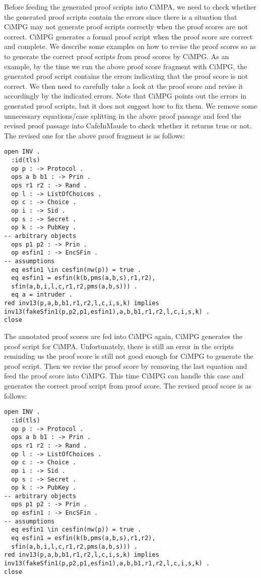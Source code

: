 \documentclass[a4paper,fleqn]{cas-dc}
\begin{document}
Before feeding the generated proof scripts into CiMPA, we need to check whether the generated proof scripts contain the errors since there is a situation that CiMPG may not generate proof scripts correctly when the proof scores are not correct. CiMPG generates a formal proof script when the proof score are correct and complete. We describe some examples on how to revise the proof scores so as to generate the correct proof scripts from proof scores by CiMPG. As an example, by the time we run the above proof score fragment with CiMPG, the generated proof script contains the errors indicating that the proof score is not correct. We then need to carefully take a look at the proof score and revise it accordingly by the indicated errors. Note that CiMPG points out the errors in generated proof scripts, but it does not suggest how to fix them. We remove some unnecessary equations/case splitting in the above proof passage and feed the revised proof passage into CafeInMaude to check whether it returns true or not. The revised one for the above proof fragment is as follows:
\begin{small}
\begin{verbatim}
open INV .
  :id(tls)
  op p : -> Protocol .
  ops a b b1 : -> Prin .
  ops r1 r2 : -> Rand .
  op l : -> ListOfChoices .
  op c : -> Choice .
  op i : -> Sid .
  op s : -> Secret .
  op k : -> PubKey .
-- arbitrary objects
  ops p1 p2 : -> Prin .
  op esfin1 : -> EncSFin .
-- assumptions
  eq esfin1 \in cesfin(nw(p)) = true .
  eq esfin1 = esfin(k(b,pms(a,b,s),r1,r2),
  sfin(a,b,i,l,c,r1,r2,pms(a,b,s))) .
  eq a = intruder .
red inv13(p,a,b,b1,r1,r2,l,c,i,s,k) implies
inv13(fakeSfin1(p,p2,p1,esfin1),a,b,b1,r1,r2,l,c,i,s,k) .
close
\end{verbatim}
\end{small}
The annotated proof scores are fed into CiMPG again, CiMPG  generates the proof script for CiMPA. Unfortunately, there is still an error in the scripts reminding us the proof score is still not good enough for CiMPG to generate the proof script. Then we revise the proof score by removing the last equation and feed the proof score into CiMPG. This time CiMPG can handle this case and generates the correct proof script from proof score. The revised proof score is as follows:
\begin{small}
\begin{verbatim}
open INV .
  :id(tls)
  op p : -> Protocol .
  ops a b b1 : -> Prin .
  ops r1 r2 : -> Rand .
  op l : -> ListOfChoices .
  op c : -> Choice .
  op i : -> Sid .
  op s : -> Secret .
  op k : -> PubKey .
-- arbitrary objects
  ops p1 p2 : -> Prin .
  op esfin1 : -> EncSFin .
-- assumptions
  eq esfin1 \in cesfin(nw(p)) = true .
  eq esfin1 = esfin(k(b,pms(a,b,s),r1,r2),
  sfin(a,b,i,l,c,r1,r2,pms(a,b,s))) .
red inv13(p,a,b,b1,r1,r2,l,c,i,s,k) implies
inv13(fakeSfin1(p,p2,p1,esfin1),a,b,b1,r1,r2,l,c,i,s,k) .
close
\end{verbatim}
\end{small}
\end{document}
